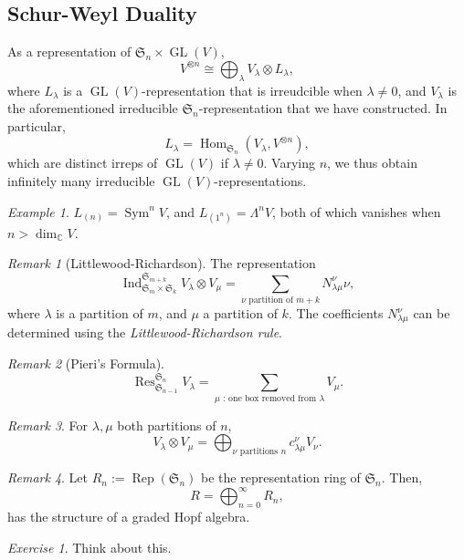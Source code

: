 \documentclass[a4paper]{report}
\theoremstyle{definition}
\theoremstyle{remark}
\newtheorem{remark}{Remark}
\theoremstyle{proposition}
\theoremstyle{conjecture}
\theoremstyle{lemma}
\theoremstyle{corollary}
\theoremstyle{exercise}
\newtheorem{exercise}{Exercise}
\theoremstyle{example}
\newtheorem{example}{Example}
\newcommand{\C}{\mathbb{C}}
\newcommand{\on}{\operatorname}
\begin{document}
\subsection{Schur-Weyl Duality}

As a representation of $\mathfrak{S}_n \times \on{GL}(V)$,
$$V^{\otimes n} \cong \bigoplus_\lambda V_\lambda \otimes L_\lambda,$$
where $L_\lambda$ is a $\on{GL}(V)$-representation that is irreudcible
when $\lambda\neq 0$, and $V_\lambda$ is the aforementioned 
irreducible $\mathfrak{S}_n$-representation that we have constructed.
In particular,
$$L_\lambda = \on{Hom}_{\mathfrak{S}_n}(V_\lambda,V^{\otimes n}),$$
which are distinct irreps of $\on{GL}(V)$ if $\lambda \neq 0$.
Varying $n$, we thus obtain infinitely many irreducible 
$\on{GL}(V)$-representations.

\begin{example}
    $L_{(n)} = \on{Sym}^nV$, and $L_{(1^n)} = \Lambda^nV$, both of which 
    vanishes when $n > \dim_\C V$.
\end{example}

\begin{remark}[Littlewood-Richardson]
    The representation
    $$\on{Ind}_{\mathfrak{S}_m \times \mathfrak{S}_k}^{\mathfrak{S}_{m+k}} V_\lambda \otimes V_\mu = \sum_{\text{$\nu$ partition of $m+k$}} N_{\lambda\mu}^\nu\nu,$$
    where $\lambda$ is a partition of $m$, and $\mu$ a partition of 
    $k$. The coefficients $N_{\lambda\mu}^\nu$ can be determined 
    using the \emph{Littlewood-Richardson rule}.
\end{remark}

\begin{remark}[Pieri's Formula]
    $$\on{Res}^{\mathfrak{S}_n}_{\mathfrak{S}_{n-1}} V_\lambda = \sum_{\text{$\mu$ : one box removed from $\lambda$}} V_\mu.$$
\end{remark}

\begin{remark}
    For $\lambda,\mu$ both partitions of $n$,
    $$V_\lambda \otimes V_\mu = \bigoplus_{\text{$\nu$ partitions $n$}} c_{\lambda\mu}^\nu V_\nu.$$
\end{remark}

\begin{remark}
    Let $R_n := \on{Rep}(\mathfrak{S}_n)$ be the representation ring of 
    $\mathfrak{S}_n$. 
    Then,
    $$R = \bigoplus_{n=0}^\infty R_n,$$
    has the structure of a graded Hopf algebra.
    \begin{exercise}
        Think about this.
    \end{exercise}
\end{remark}
\end{document}
